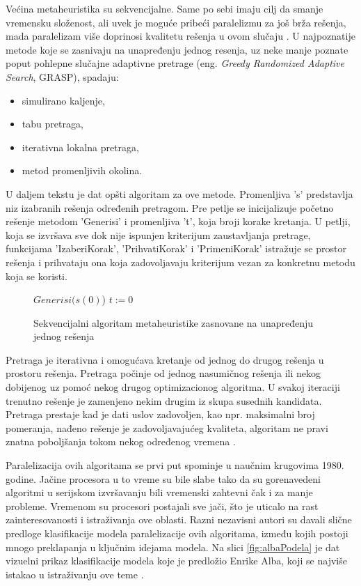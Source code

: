 \documentclass[a4paper]{article}
\newenvironment{algoritam}[1][htb]
{\renewcommand{\algorithmcfname}{Algoritam}
\begin{figure}[ht]
\centering
  \begin{minipage}{.75\linewidth}
	\begin{algorithm}[#1]%
  }{\end{algorithm}
  \end{minipage}
\end{figure}}
\begin{document}
Većina metaheuristika su sekvencijalne. Same po sebi imaju cilj da smanje vremensku složenost, ali uvek je moguće pribeći paralelizmu za još brža rešenja, mada paralelizam više doprinosi kvalitetu rešenja u ovom slučaju \cite{alba2}. U najpoznatije metode koje se zasnivaju na unapređenju jednog resenja, uz neke manje poznate poput pohlepne slučajne adaptivne pretrage (eng. \textit{Greedy Randomized Adaptive Search}, GRASP), spadaju:

\begin{itemize} 
\item simulirano kaljenje,
\item tabu pretraga,
\item iterativna lokalna pretraga,
\item metod promenljivih okolina.
\end{itemize}

U daljem tekstu je dat opšti algoritam za ove metode. Promenljiva 's' predstavlja niz izabranih rešenja određenih pretragom. Pre petlje se inicijalizuje početno rešenje metodom 'Generisi' i promenljiva 't', koja broji korake kretanja.
U petlji, koja se izvršava sve dok nije ispunjen kriterijum zaustavljanja pretrage, funkcijama 'IzaberiKorak', 'PrihvatiKorak' i 'PrimeniKorak' istražuje se prostor rešenja i prihvataju ona koja zadovoljavaju kriterijum vezan za konkretnu metodu koja se koristi.

\begin{algoritam}[H]
\SetAlgoLined
 $Generisi(s(0)$)\;
 $t := 0$\;
\caption{Sekvencijalni algoritam metaheuristike zasnovane na unapređenju jednog rešenja}
\end{algoritam}

Pretraga je iterativna i omogućava kretanje od jednog do drugog rešenja u prostoru rešenja. Pretraga počinje od jednog nasumičnog rešenja ili nekog dobijenog uz pomoć nekog drugog optimizacionog algoritma. U svakoj iteraciji trenutno rešenje je zamenjeno nekim drugim iz skupa susednih kandidata. Pretraga prestaje kad je dati uslov zadovoljen, kao npr. maksimalni broj pomeranja, nađeno rešenje je zadovoljavajućeg kvaliteta, algoritam ne pravi znatna poboljšanja tokom nekog određenog vremena \cite{alba2}.

Paralelizacija ovih algoritama se prvi put spominje u naučnim krugovima 1980. godine. Jačine procesora u to vreme su bile slabe tako da su gorenavedeni algoritmi u serijskom izvršavanju bili vremenski zahtevni čak i za manje probleme. Vremenom su procesori postajali sve jači, što je uticalo na rast zainteresovanosti i istraživanja ove oblasti. Razni nezavisni autori su davali slične predloge klasifikacije modela paralelizacije ovih algoritama, između kojih postoji mnogo preklapanja u ključnim idejama modela. Na slici \ref{fig:albaPodela} je dat vizuelni prikaz klasifikacije modela koje je predložio Enrike Alba, koji se najviše istakao u istraživanju ove teme \cite{alba}.
\end{document}
